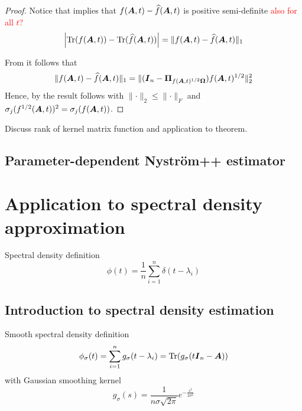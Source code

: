 \documentclass[12pt]{article}
\begin{document}
\begin{proof}
    Notice that \cite[Lemma 2.1, item 3]{frangella-2023-randomized-nystrom} implies that $f(\boldsymbol{A}, t) - \widehat{f}(\boldsymbol{A}, t)$ is positive semi-definite \textcolor{red}{also for all $t$?}
    \begin{equation}
        \left| \operatorname{Tr}(f(\boldsymbol{A}, t)) - \operatorname{Tr}(\widehat{f}(\boldsymbol{A}, t)) \right|
        = \lVert f(\boldsymbol{A}, t) - \widehat{f}(\boldsymbol{A}, t) \rVert _1
    \end{equation}

    From \cite[Proof of Corollary 8.2]{tropp-2023-randomized-algorithms} it follows that
    \begin{equation}
        \lVert f(\boldsymbol{A}, t) - \widehat{f}(\boldsymbol{A}, t) \rVert _1 = \lVert (\boldsymbol{I}_n - \boldsymbol{\Pi}_{f(\boldsymbol{A}, t)^{1/2} \boldsymbol{\Omega}}) f(\boldsymbol{A}, t)^{1/2} \rVert _2^2
    \end{equation}
    Hence, by \cite[Theorem 9]{kressner-2023-randomized-lowrank} the result follows
    with $\lVert \cdot \rVert _2 \leq \lVert \cdot \rVert _F$ and $\sigma_j(f^{1/2}(\boldsymbol{A}, t))^{2} = \sigma_j(f(\boldsymbol{A}, t))$.
\end{proof}

Discuss rank of kernel matrix function and application to theorem.

\subsection{Parameter-dependent Nyström++ estimator}
\label{subsec:nystrom-pp}

\section{Application to spectral density approximation}
\label{sec:application}

Spectral density definition
\begin{equation}
    \phi(t) = \frac{1}{n} \sum_{i=1}^{n} \delta(t - \lambda_i)
    \label{equ:spectral-density}
\end{equation}

\subsection{Introduction to spectral density estimation}
\label{subsec:spectral-density}

Smooth spectral density definition
\begin{equation}
    \phi_{\sigma}(t) = \sum_{i=1}^{n} g_{\sigma}(t - \lambda_i) = \operatorname{Tr}(g_{\sigma}(t\boldsymbol{I}_n - \boldsymbol{A}))
    \label{equ:smooth-spectral-density}
\end{equation}
with Gaussian smoothing kernel
\begin{equation}
    g_{\sigma}(s) = \frac{1}{n \sigma \sqrt{2\pi}} e^{-\frac{s^2}{2\sigma^2}}
    \label{smoothing-kernel}
\end{equation}
\end{document}
